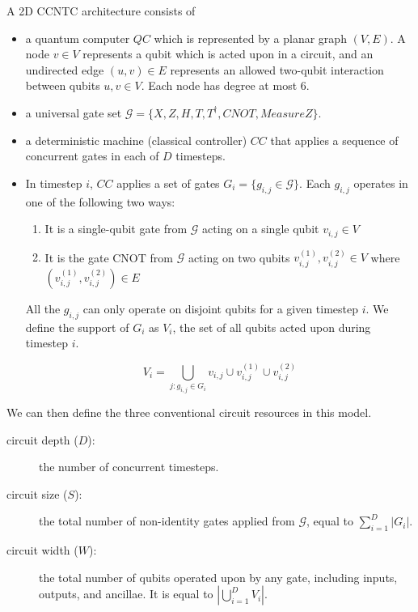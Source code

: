 \documentclass[twoside]{article}
\begin{document}
\begin{definition}
A 2D CCNTC architecture consists of

\begin{itemize}
\item a quantum computer $QC$ which is represented by a planar graph $(V,E)$. A
node $v \in V$ represents a qubit which is acted upon in a circuit, and an
undirected edge $(u,v) \in E$ represents 
an allowed two-qubit interaction between qubits $u,v \in V$. Each node has
degree at most $6$.
\item a universal gate set $\mathcal{G} = \{X, Z, H, T, T^{\dagger}, CNOT, MeasureZ\}$.

\item a deterministic machine (classical controller) $CC$ that applies a sequence
of concurrent gates in each of $D$ timesteps.
\item In timestep $i$, $CC$ applies a set of
gates $G_i = \{g_{i,j} \in \mathcal{G} \}$.
Each $g_{i,j}$ operates in one of the following two ways:
\begin{enumerate}
\item It is a single-qubit gate from $\mathcal{G}$ acting on a single qubit $v_{i,j} \in V$
\item
It is the gate CNOT from $\mathcal{G}$ acting on two qubits $v^{(1)}_{i,j}, v^{(2)}_{i,j} \in V$ where
$(v^{(1)}_{i,j}, v^{(2)}_{i,j}) \in E$
\end{enumerate}
All the $g_{i,j}$ can only operate on
disjoint qubits for a given timestep $i$. We define the support of $G_i$
as $V_i$, the set of all qubits acted upon during timestep $i$.

\begin{equation}
V_i = \bigcup_{j: g_{i,j} \in G_i} v_{i,j} \cup v^{(1)}_{i,j} \cup v^{(2)}_{i,j}
\end{equation}

\end{itemize}
\end{definition}

We can then define the three conventional circuit resources in this model.

\begin{description}
\item[circuit depth ($D$):] the number of concurrent timesteps.
\item[circuit size ($S$):] the total number of non-identity gates applied
from $\mathcal{G}$, equal to $\sum_{i=1}^D |G_i|$.
\item[circuit width ($W$):] the total number of qubits operated upon by
any gate, including inputs, outputs, and ancillae. It is equal to $| \bigcup_{i=1}^D V_i|$.
\end{description}
\end{document}
